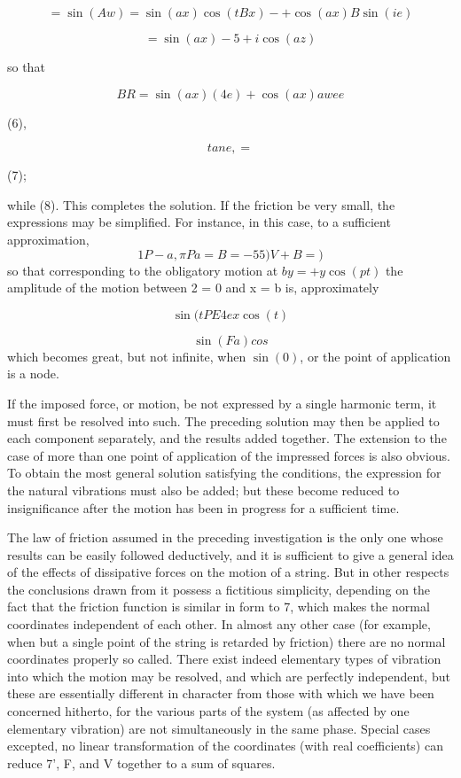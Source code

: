 \[= \sin(Aw) = \sin(ax) \cos(tBx)-+ \cos(ax) B \sin(ie)\]

\[= \sin(ax) -5 +i \cos(az)\]

so that

\[BR = \sin(ax) (4e) + \cos(ax) a wee\]

(6),

\[tan e, =\]

(7);

while (8). This completes the solution. If the friction be very small, the
expressions may be simplified. For instance, in this case, to a sufficient
approximation,
\[1 P -  a, \pi P a= B=-55) V+ B=)\]
so that corresponding to
the obligatory motion at \(b y=+y \cos(pt)\) the amplitude of the motion
between 2 = 0 and x = b is, approximately

\[\sin(t PE 4 ex \cos(t)\]

\[\sin(Fa) cos\]
which becomes great, but not infinite, when \(\sin(0)\), or
the point of application is a node.

If the imposed force, or motion, be not expressed by a single harmonic term, it
must first be resolved into such. The preceding solution may then be applied to
each component separately, and the results added together. The extension to the
case of more than one point of application of the impressed forces is also
obvious. To obtain the most general solution satisfying the conditions, the
expression for the natural vibrations must also be added; but these become
reduced to insignificance after the motion has been in progress for a
sufficient time.

The law of friction assumed in the preceding investigation is the only one
whose results can be easily followed deductively, and it is sufficient to give
a general idea of the effects of dissipative forces on the motion of a string.
But in other respects the conclusions drawn from it possess a fictitious
simplicity, depending on the fact that the friction function is similar in form
to 7, which makes the normal coordinates independent of each other. In almost
any other case (for example, when but a single point of the string is retarded
by friction) there are no normal coordinates properly so called. There exist
indeed elementary types of vibration into which the motion may be resolved, and
which are perfectly independent, but these are essentially different in
character from those with which we have been concerned hitherto, for the
various parts of the system (as affected by one elementary vibration) are not
simultaneously in the same phase. Special cases excepted, no linear
transformation of the coordinates (with real coefficients) can reduce 7', F,
and V together to a sum of squares.

